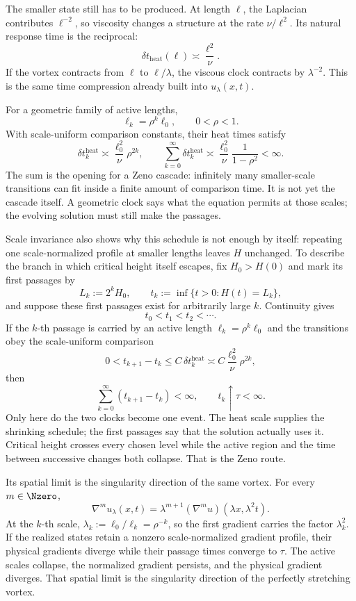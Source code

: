 The smaller state still has to be produced.  At length \(\ell\), the Laplacian contributes \(\ell^{-2}\), so viscosity changes a structure at the rate \(\nu/\ell^2\).  Its natural response time is the reciprocal:
\begin{equation}\label{eq:BodyHeatComparisonTime}
  \delta t_{\mathrm{heat}}(\ell)\asymp\frac{\ell^2}{\nu}.
\end{equation}
If the vortex contracts from \(\ell\) to \(\ell/\lambda\), the viscous clock contracts by \(\lambda^{-2}\).  This is the same time compression already built into \(u_\lambda(x,t)\).

For a geometric family of active lengths,
\[
  \ell_k=\rho^k\ell_0,
  \qquad 0<\rho<1.
\]
With scale-uniform comparison constants, their heat times satisfy
\[
  \delta t_k^{\mathrm{heat}}
  \asymp\frac{\ell_0^2}{\nu}\rho^{2k},
  \qquad
  \sum_{k=0}^{\infty}\delta t_k^{\mathrm{heat}}
  \asymp
  \frac{\ell_0^2}{\nu}\frac{1}{1-\rho^2}<\infty.
\]
The sum is the opening for a Zeno cascade: infinitely many smaller-scale transitions can fit inside a finite amount of comparison time.  It is not yet the cascade itself.  A geometric clock says what the equation permits at those scales; the evolving solution must still make the passages.

Scale invariance also shows why this schedule is not enough by itself: repeating one scale-normalized profile at smaller lengths leaves \(H\) unchanged.  To describe the branch in which critical height itself escapes, fix \(H_0>H(0)\) and mark its first passages by
\[
  L_k:=2^kH_0,
  \qquad
  t_k:=\inf\{t>0:H(t)=L_k\},
\]
and suppose these first passages exist for arbitrarily large \(k\).  Continuity gives
\[
  t_0<t_1<t_2<\cdots.
\]
If the \(k\)-th passage is carried by an active length \(\ell_k=\rho^k\ell_0\) and the transitions obey the scale-uniform comparison
\[
  0<t_{k+1}-t_k
  \leq C\,\delta t_k^{\mathrm{heat}}
  \asymp C\frac{\ell_0^2}{\nu}\rho^{2k},
\]
then
\[
  \sum_{k=0}^{\infty}(t_{k+1}-t_k)<\infty,
  \qquad
  t_k\uparrow\tau<\infty.
\]
Only here do the two clocks become one event.  The heat scale supplies the shrinking schedule; the first passages say that the solution actually uses it.  Critical height crosses every chosen level while the active region and the time between successive changes both collapse.  That is the Zeno route.

Its spatial limit is the singularity direction of the same vortex.  For every \(m\in\Nzero\),
\[
  \nabla^m u_\lambda(x,t)
  =\lambda^{m+1}(\nabla^m u)(\lambda x,\lambda^2t).
\]
At the \(k\)-th scale, \(\lambda_k:=\ell_0/\ell_k=\rho^{-k}\), so the first gradient carries the factor \(\lambda_k^2\).  If the realized states retain a nonzero scale-normalized gradient profile, their physical gradients diverge while their passage times converge to \(\tau\).  The active scales collapse, the normalized gradient persists, and the physical gradient diverges.  That spatial limit is the singularity direction of the perfectly stretching vortex.
